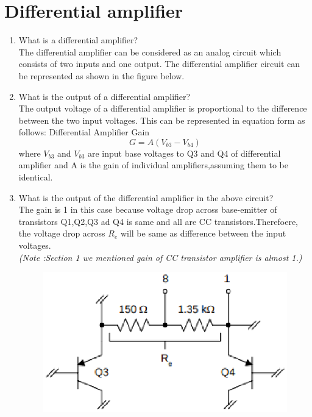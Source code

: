 \documentclass[journal,12pt,twocolumn]{IEEEtran}
\renewcommand\thesection{\arabic{section}}
\begin{document}
\section{Differential amplifier}
\begin{enumerate}[label=\thesection.\arabic*,ref=\thesection.\theenumi]
\item What is a differential amplifier?\\
\solution The differential amplifier can be considered as an analog circuit which consists of two inputs and one output. The differential amplifier circuit can be represented as shown in the figure below.\\
\item What is the output of a differential amplifier?\\
\solution The output voltage of a differential amplifier is proportional to the difference between the two input voltages. This can be represented in equation form as follows:
Differential Amplifier Gain $$G = A(V_{b3}-V_{b4})$$
where $V_{b3}$ and $V_{b3}$ are input base voltages to Q3 and Q4 of differential amplifier and A is the gain of individual amplifiers,assuming them to be identical.\\


\item What is the output of the differential amplifier in the above circuit?\\

 \solution The gain is 1 in this case because voltage drop across base-emitter of transistors Q1,Q2,Q3 ad Q4 is same and all are CC transistors.Therefoere, the voltage drop across $R_{e}$ will be same as difference between the input voltages.\\\textit{(Note :Section 1 we mentioned gain of CC transistor amplifier is almost 1.)}\\
 \begin{figure}[!ht]
\centering
\includegraphics[width=0.7\columnwidth]{./Fig/LM3662.eps}
\caption{}
\label{fig:1}
\end{figure}

\end{enumerate}
\end{document}
